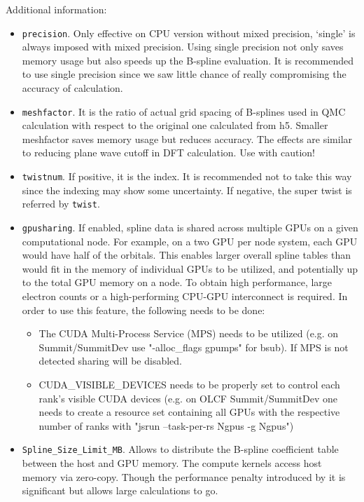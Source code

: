 Additional information:
\begin{itemize}
\item \texttt{precision}. Only effective on CPU version without mixed precision, `single' is always imposed with mixed precision. Using single precision not only saves memory usage but also speeds up the B-spline evaluation. It is recommended to use single precision since we saw little chance of really compromising the accuracy of calculation.
\item \texttt{meshfactor}. It is the ratio of actual grid spacing of B-splines used in QMC calculation with respect to the original one calculated from h5. Smaller meshfactor saves memory usage but reduces accuracy. The effects are similar to reducing plane wave cutoff in DFT calculation. Use with caution! 
\item \texttt{twistnum}. If positive, it is the index. It is recommended not to take this way since the indexing may show some uncertainty. If negative, the super twist is referred by \texttt{twist}.
\item \texttt{gpusharing}. If enabled, spline data is shared across multiple GPUs on a given computational node. For example, on a
two GPU per node system, each GPU would have half of the
orbitals. This enables larger overall spline tables than would fit in
the memory of individual GPUs to be utilized, and potentially up to
the total GPU memory on a node. To obtain high performance, large
electron counts or a high-performing CPU-GPU interconnect is required.
In order to use this feature, the following needs to be done:
\begin{itemize}
    \item The CUDA Multi-Process Service (MPS) needs to be utilized
      (e.g. on Summit/SummitDev use "-alloc\_flags gpumps" for
      bsub). If MPS is not detected sharing will be disabled.
    \item CUDA\_VISIBLE\_DEVICES needs to be properly set to control each
      rank's visible CUDA devices (e.g. on OLCF Summit/SummitDev one
      needs to create a resource set containing all GPUs with the
      respective number of ranks with "jsrun --task-per-rs Ngpus -g
      Ngpus")
\end{itemize}
\item \texttt{Spline\_Size\_Limit\_MB}. Allows to distribute the B-spline coefficient table between the host and GPU memory. The compute kernels access host memory via zero-copy. Though the performance penalty introduced by it is significant but allows large calculations to go.
\end{itemize}
